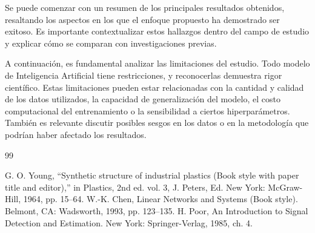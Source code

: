 \documentclass[letterpaper, 10 pt, conference]{ieeeconf}  %
\begin{document}
Se puede comenzar con un resumen de los principales resultados obtenidos, resaltando los aspectos en los que el enfoque propuesto ha demostrado ser exitoso. Es importante contextualizar estos hallazgos dentro del campo de estudio y explicar cómo se comparan con investigaciones previas.

A continuación, es fundamental analizar las limitaciones del estudio. Todo modelo de Inteligencia Artificial tiene restricciones, y reconocerlas demuestra rigor científico. Estas limitaciones pueden estar relacionadas con la cantidad y calidad de los datos utilizados, la capacidad de generalización del modelo, el costo computacional del entrenamiento o la sensibilidad a ciertos hiperparámetros. También es relevante discutir posibles sesgos en los datos o en la metodología que podrían haber afectado los resultados.


\begin{thebibliography}{99}

 G. O. Young, ``Synthetic structure of industrial plastics (Book style with paper title and editor),'' 	in Plastics, 2nd ed. vol. 3, J. Peters, Ed.  New York: McGraw-Hill, 1964, pp. 15--64.
 W.-K. Chen, Linear Networks and Systems (Book style).	Belmont, CA: Wadsworth, 1993, pp. 123--135.
 H. Poor, An Introduction to Signal Detection and Estimation.   New York: Springer-Verlag, 1985, ch. 4.

\end{thebibliography}
\end{document}
